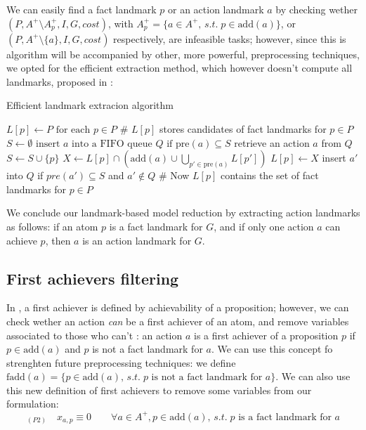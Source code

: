 We can easily find a fact landmark $p$ or an action landmark $a$ by checking wether $(P,A^+\setminus A^+_p,I,G,cost)$, with $A^+_p=\{a\in A^+,\,s.t.\;p\in \mbox{add}(a)\}$, or $(P,A^+\setminus \{a\},I,G,cost)$ respectively, are infeasible tasks; however, since this is algorithm will be accompanied by other, more powerful, preprocessing techniques, we opted for the efficient extraction method, which however doesn't compute all landmarks, proposed in \cite{Imai_15}:
\begin{algorithm}[h]
    \caption{Efficient landmark extracion algorithm}
    \begin{algorithmic}
        \State $L[p]\gets P\mbox{ for each } p\in P$ \qquad \# $L[p]$ stores candidates of fact landmarks for $p\in P$
        \State $S\gets\emptyset$
            \State $\mbox{insert }a\mbox{ into a FIFO queue }Q\mbox{ if }\mbox{pre}(a)\subseteq S$
        \EndFor
            \State retrieve an action $a$ from $Q$
                \State $S\gets S\cup\{p\}$
                \State $X\gets L[p]\cap(\mbox{add}(a)\cup\bigcup_{p'\in \mbox{pre}(a)}L[p'])$
                    \State $L[p]\gets X$
                    \State insert $a'$ into $Q$ if $pre(a')\subseteq S$ and $a'\not\in Q$
                    \EndFor
                \EndIf
            \EndFor
        \EndWhile
        \State \# Now $L[p]$ contains the set of fact landmarks for $p\in P$
    \end{algorithmic}
\end{algorithm}

We conclude our landmark-based model reduction by extracting action landmarks as follows: if an atom $p$ is a fact landmark for $G$, and if only one action $a$ can achieve $p$, then $a$ is an action landmark for $G$.

\subsection{First achievers filtering}
In \cite{LB_Haslum_12}, a first achiever is defined by achievability of a proposition; however, we can check wether an action \textit{can} be a first achiever of an atom, and remove variables associated to those who can't \cite{Imai_15}: an action $a$ is a first achiever of a proposition $p$ if $p\in \mbox{add}(a)$ and $p$ is not a fact landmark for $a$.
We can use this concept fo strenghten future preprocessing techniques: we define $\mbox{fadd}(a)=\{p\in \mbox{add}(a),\,s.t.\;p\mbox{ is not a fact landmark for }a\}$.
We can also use this new definition of first achievers to remove some variables from our formulation:
$$_{(P2)}\quad x_{a,p}\equiv0\qquad\forall a\in A^+,p\in \mbox{add}(a),\,s.t.\;p\mbox{ is a fact landmark for }a$$

